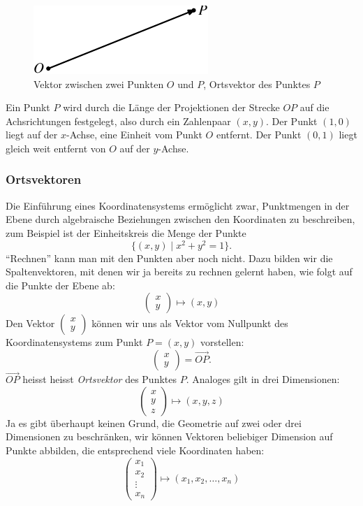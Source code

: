 \begin{figure}
\begin{center}
\includegraphics{images/v-1}
\end{center}
\caption{Vektor zwischen zwei Punkten $O$ und $P$, Ortsvektor des Punktes $P$
\label{image-vektor}}
\end{figure}
Ein Punkt $P$ wird durch die Länge der Projektionen der Strecke $OP$
auf die Achsrichtungen festgelegt, also durch ein Zahlenpaar $(x,y)$.
Der Punkt $(1,0)$ liegt auf der $x$-Achse, eine Einheit vom Punkt $O$
entfernt.
Der Punkt $(0,1)$ liegt gleich weit entfernt von $O$ auf der $y$-Achse.

\subsubsection{Ortsvektoren}
Die Einführung eines Koordinatensystems ermöglicht zwar, Punktmengen
in der Ebene durch algebraische Beziehungen zwischen den Koordinaten
zu beschreiben, zum Beispiel ist der Einheitskreis die Menge der
Punkte
\[
\{(x,y)\;|\;x^2+y^2=1\}.
\]
``Rechnen'' kann man mit den Punkten aber noch nicht.
Dazu bilden wir
die Spaltenvektoren, mit denen wir ja bereits zu rechnen gelernt haben,
wie folgt auf die Punkte der Ebene ab:
\[
\begin{pmatrix}x\\y\end{pmatrix}
\mapsto (x,y)
\]
Den Vektor $\begin{pmatrix}x\\y\end{pmatrix}$ können wir uns als
Vektor vom Nullpunkt des Koordinatensystems zum Punkt $P=(x,y)$ vorstellen:
\[
\begin{pmatrix}x\\y\end{pmatrix}
=
\overset{\rightarrow}{OP}.
\]
$\overrightarrow{OP}$ heisst
heisst {\em Ortsvektor} des Punktes $P$.
Analoges gilt in drei Dimensionen:
\[
\begin{pmatrix}x\\y\\z\end{pmatrix}
\mapsto
(x,y,z)
\]
Ja es gibt überhaupt keinen Grund, die Geometrie auf zwei oder drei
Dimensionen zu beschränken, wir können Vektoren beliebiger Dimension
auf Punkte
abbilden, die entsprechend viele Koordinaten haben:
\[
\begin{pmatrix}
x_1\\x_2\\\vdots\\x_n
\end{pmatrix}
\mapsto
(x_1,x_2,\dots,x_n)
\]

